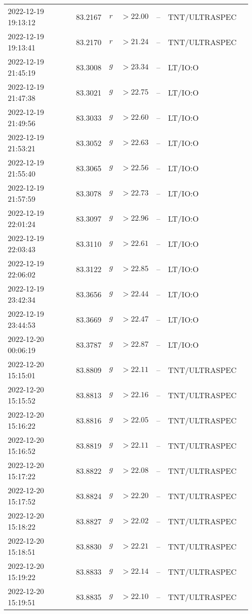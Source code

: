 \documentclass{nature_plusfigure}
\begin{document}
\begin{supplement}
\begin{center}
\begin{longtable}{lllllll}
2022-12-19 19:13:12 & 83.2167 & $r$ & $>22.00$ & -- & TNT/ULTRASPEC &  \\ 
2022-12-19 19:13:41 & 83.2170 & $r$ & $>21.24$ & -- & TNT/ULTRASPEC &  \\ 
2022-12-19 21:45:19 & 83.3008 & $g$ & $>23.34$ & -- & LT/IO:O &  \\ 
2022-12-19 21:47:38 & 83.3021 & $g$ & $>22.75$ & -- & LT/IO:O &  \\ 
2022-12-19 21:49:56 & 83.3033 & $g$ & $>22.60$ & -- & LT/IO:O &  \\ 
2022-12-19 21:53:21 & 83.3052 & $g$ & $>22.63$ & -- & LT/IO:O &  \\ 
2022-12-19 21:55:40 & 83.3065 & $g$ & $>22.56$ & -- & LT/IO:O &  \\ 
2022-12-19 21:57:59 & 83.3078 & $g$ & $>22.73$ & -- & LT/IO:O &  \\ 
2022-12-19 22:01:24 & 83.3097 & $g$ & $>22.96$ & -- & LT/IO:O &  \\ 
2022-12-19 22:03:43 & 83.3110 & $g$ & $>22.61$ & -- & LT/IO:O &  \\ 
2022-12-19 22:06:02 & 83.3122 & $g$ & $>22.85$ & -- & LT/IO:O &  \\ 
2022-12-19 23:42:34 & 83.3656 & $g$ & $>22.44$ & -- & LT/IO:O &  \\ 
2022-12-19 23:44:53 & 83.3669 & $g$ & $>22.47$ & -- & LT/IO:O &  \\ 
2022-12-20 00:06:19 & 83.3787 & $g$ & $>22.87$ & -- & LT/IO:O &  \\ 
2022-12-20 15:15:01 & 83.8809 & $g$ & $>22.11$ & -- & TNT/ULTRASPEC &  \\ 
2022-12-20 15:15:52 & 83.8813 & $g$ & $>22.16$ & -- & TNT/ULTRASPEC &  \\ 
2022-12-20 15:16:22 & 83.8816 & $g$ & $>22.05$ & -- & TNT/ULTRASPEC &  \\ 
2022-12-20 15:16:52 & 83.8819 & $g$ & $>22.11$ & -- & TNT/ULTRASPEC &  \\ 
2022-12-20 15:17:22 & 83.8822 & $g$ & $>22.08$ & -- & TNT/ULTRASPEC &  \\ 
2022-12-20 15:17:52 & 83.8824 & $g$ & $>22.20$ & -- & TNT/ULTRASPEC &  \\ 
2022-12-20 15:18:22 & 83.8827 & $g$ & $>22.02$ & -- & TNT/ULTRASPEC &  \\ 
2022-12-20 15:18:51 & 83.8830 & $g$ & $>22.21$ & -- & TNT/ULTRASPEC &  \\ 
2022-12-20 15:19:22 & 83.8833 & $g$ & $>22.14$ & -- & TNT/ULTRASPEC &  \\ 
2022-12-20 15:19:51 & 83.8835 & $g$ & $>22.10$ & -- & TNT/ULTRASPEC &  \\ 

\end{longtable}
\end{center}
\end{supplement}
\end{document}
